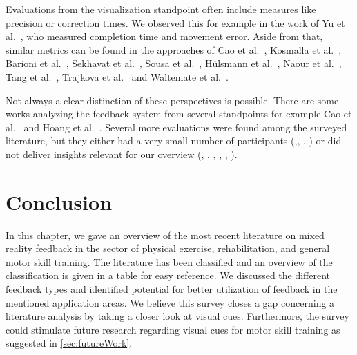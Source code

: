 Evaluations from the visualization standpoint often include measures like precision or correction times. We observed this for example in the work of Yu et al.~\cite{yu2020pmd}, who measured completion time and movement error. Aside from that, similar metrics can be found in the approaches of Cao et al.~\cite{cao2020esa}, Kosmalla et al.~\cite{kosmalla2017cvi}, Barioni et al.~\cite{hoang2016orp}, Sekhavat et al.~\cite{sekhavat2018pba}, Sousa et al.~\cite{sousa2016sar}, Hülsmann et al.~\cite{huelsmann2019ssp}, Naour et al.~\cite{naour2019s3d}, Tang et al.~\cite{tang2015pah}, Trajkova et al.~\cite{trajkova2018ttb} and Waltemate et al.~\cite{waltemate2016tlp}.

Not always a clear distinction of these perspectives is possible. There are some works analyzing the feedback system from several standpoints for example Cao et al.~\cite{cao2020esa} and Hoang et al.~\cite{hoang2016orp}. Several more evaluations were found among the surveyed literature, but they either had a very small number of participants (\cite{oshita2018sts},\cite{meyer2018jlc}, \cite{escalona2020eva}, \cite{conner2016cef}) or did not deliver insights relevant for our overview (\cite{clarke2020rva}, \cite{han2016ara}, \cite{pereira2017jat}, \cite{caserman2021fbm}, \cite{vidal2020blo}, \cite{oka2021rtf}).

\section{Conclusion \label{sec:tvcg:conclusion}}
In this chapter, we gave an overview of the most recent literature on mixed reality feedback in the sector of physical exercise, rehabilitation, and general motor skill training. The literature has been classified and an overview of the classification is given in a table for easy reference. We discussed the different feedback types and identified potential for better utilization of feedback in the mentioned application areas.
We believe this survey closes a gap concerning a literature analysis by taking a closer look at visual cues. Furthermore, the survey could stimulate future research regarding visual cues for motor skill training as suggested in \autoref{sec:futureWork}.

